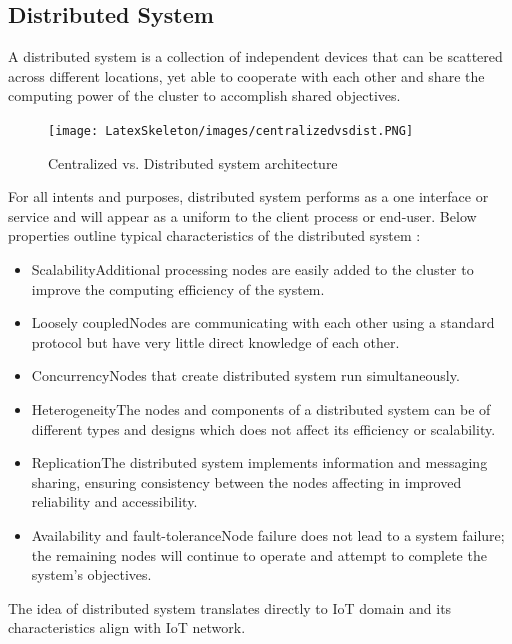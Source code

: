 \documentclass[oneside,12pt]{book}
\begin{document}
\subsection{Distributed System}
\par A distributed system is a collection of independent devices that can be scattered across different locations, yet able to cooperate with each other and share the computing power of the cluster to accomplish shared objectives.
\begin{figure}[H]
\centering
\texttt{[image: LatexSkeleton/images/centralizedvsdist.PNG]}
\caption{Centralized vs. Distributed system architecture}\citep{10.1007/978-981-13-8300-7_2}
\end{figure}
\noindent For all intents and purposes, distributed system performs as a one interface or service and will appear as a uniform to the client process or end-user. Below properties outline typical characteristics of the distributed system \citep{PUDER20067}:
\begin{itemize}
  \item Scalability\smallskip \newline Additional processing nodes are easily added to the cluster to improve the computing efficiency of the system.
  \item Loosely coupled\smallskip \newline Nodes are communicating with each other using a standard protocol but have very little direct knowledge of each other.
  \item Concurrency\smallskip \newline Nodes that create distributed system run simultaneously. 
  \item Heterogeneity\smallskip \newline The nodes and components of a distributed system can be of different types and designs which does not affect its efficiency or scalability.
  \item Replication\smallskip \newline The distributed system implements information and messaging sharing, ensuring consistency between the nodes affecting in improved reliability and accessibility.
  \item Availability and fault-tolerance\smallskip \newline Node failure does not lead to a system failure; the remaining nodes will continue to operate and attempt to complete the system’s objectives.
\end{itemize}
\noindent The idea of distributed system translates directly to IoT domain \citep{7058993} and its characteristics align with IoT network.
\end{document}

